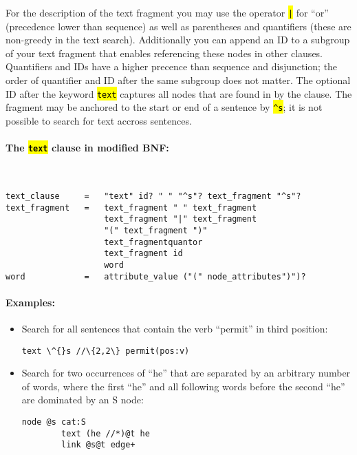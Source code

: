 \documentclass[12pt]{scrartcl}
\newcommand{\code}[1]{\hl{\texttt{#1}}}
\begin{document}
For the description of the text fragment you may use the operator \code{|} for “or” (precedence lower than sequence) as well as parentheses and quantifiers (these are non-greedy in the text search).
Additionally you can append an ID to a subgroup of your text fragment that enables referencing these nodes in other clauses.
Quantifiers and IDs have a higher precence than sequence and disjunction; the order of quantifier and ID after the same subgroup does not matter.
The optional ID after the keyword \code{text} captures all nodes that are found in by the clause.
The fragment may be anchored to the start or end of a sentence by \code{\textasciicircum s}; it is not possible to search for text accross sentences.

\paragraph*{The \code{text} clause in modified BNF:}
~
\begin{lstlisting}
text_clause     =   "text" id? " " "^s"? text_fragment "^s"?
text_fragment   =   text_fragment " " text_fragment
                    text_fragment "|" text_fragment
                    "(" text_fragment ")"
                    text_fragmentquantor
                    text_fragment id
                    word
word            =   attribute_value ("(" node_attributes")")?
\end{lstlisting}

\paragraph*{Examples:}
\begin{itemize}
	\item Search for all sentences that contain the verb “permit” in third position:
	\begin{lstlisting}[gobble=8,aboveskip=.6em,belowskip=.2em]
		text \^{}s //\{2,2\} permit(pos:v)
	\end{lstlisting}
	\item Search for two occurrences of “he” that are separated by an arbitrary number of words, where the first “he” and all following words before the second “he” are dominated by an S node:
	\begin{lstlisting}[gobble=8,aboveskip=.6em,belowskip=.2em]
		node @s cat:S
		text (he //*)@t he
		link @s@t edge+
	\end{lstlisting}
\end{itemize}
\end{document}
